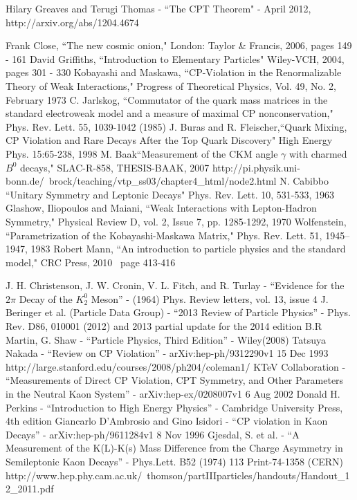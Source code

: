 \documentclass[floatfix,aps,prd,amsmath,amssymb]{revtex4}
\begin{document}
\begin{thebibliography}{10}
Hilary Greaves and Terugi Thomas - ``The CPT Theorem" - April 2012, http://arxiv.org/abs/1204.4674

Frank Close, ``The new cosmic onion,"  London: Taylor \& Francis, 2006, pages 149 - 161
David Griffiths, ``Introduction to Elementary Particles"  Wiley-VCH, 2004, pages 301 - 330
Kobayashi and Maskawa, ``CP-Violation in the Renormalizable Theory of Weak Interactions," Progress of Theoretical Physics, Vol. 49, No. 2, February 1973
C. Jarlskog, ``Commutator of the quark mass matrices in the standard electroweak model and a measure of maximal CP nonconservation," Phys. Rev. Lett. 55, 1039-1042 (1985)
J. Buras and R. Fleischer,``Quark Mixing, CP Violation and Rare Decays After the Top Quark Discovery" High Energy Phys. 15:65-238, 1998
M. Baak``Measurement of the CKM angle $\gamma$ with charmed $B^{0}$ decays," SLAC-R-858, THESIS-BAAK, 2007
http://pi.physik.uni-bonn.de/~brock/teaching/vtp_ss03/chapter4_html/node2.html
N. Cabibbo ``Unitary Symmetry and Leptonic Decays" Phys. Rev. Lett. 10, 531-533, 1963
Glashow, Iliopoulos and Maiani, ``Weak Interactions with Lepton-Hadron Symmetry," Physical Review D, vol. 2, Issue 7, pp. 1285-1292, 1970
Wolfenstein, ``Parametrization of the Kobayashi-Maskawa Matrix," Phys. Rev. Lett. 51, 1945–1947, 1983 
Robert Mann, ``An introduction to particle physics and the standard model," CRC Press, 2010 \, page 413-416

J. H. Christenson, J. W. Cronin, V. L. Fitch, and R. Turlay - ``Evidence for the $2 \pi$ Decay of the $K^0_2$ Meson'' - (1964) Phys. Review letters, vol. 13, issue 4
J. Beringer et al. (Particle Data Group) - ``2013 Review of Particle Physics'' - Phys. Rev. D86, 010001 (2012) and 2013 partial update for the 2014 edition 
B.R Martin, G. Shaw - ``Particle Physics, Third Edition'' - Wiley(2008)  
Tatsuya Nakada - ``Review on CP Violation'' - arXiv:hep-ph/9312290v1 15 Dec 1993 
http://large.stanford.edu/courses/2008/ph204/coleman1/  
KTeV Collaboration - ``Measurements of Direct CP Violation, CPT Symmetry, and Other Parameters in the Neutral Kaon System'' - arXiv:hep-ex/0208007v1 6 Aug 2002 
Donald H. Perkins - ``Introduction to High Energy Physics'' - Cambridge University Press, 4th edition 
Giancarlo D’Ambrosio and Gino Isidori - ``CP violation in Kaon Decays'' - arXiv:hep-ph/9611284v1 8 Nov 1996
Gjesdal, S. et al. - ``A Measurement of the K(L)-K(s) Mass Difference from the Charge Asymmetry in Semileptonic Kaon Decays'' - Phys.Lett. B52 (1974) 113 Print-74-1358 (CERN) 
http://www.hep.phy.cam.ac.uk/~thomson/partIIIparticles/handouts/Handout\_12\_2011.pdf


\end{thebibliography}
\end{document}

